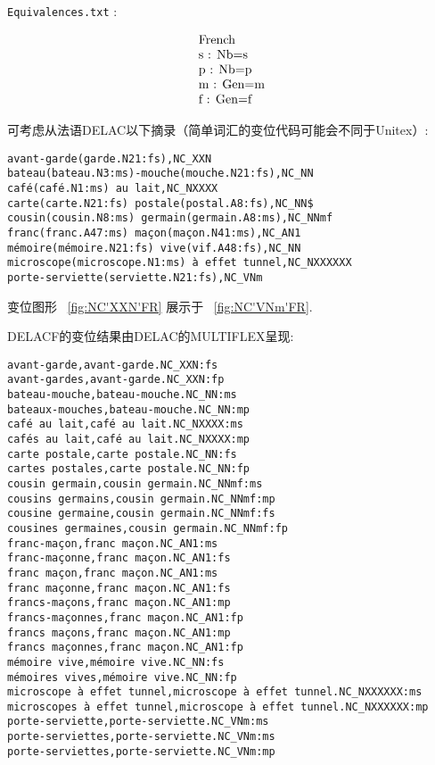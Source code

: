 \bigskip
{} \verb+Equivalences.txt+ :

\[
\begin{array}[l]{l}
$French$ \\
$s : Nb=s$ \\
$p : Nb=p$ \\
$m : Gen=m$ \\
$f : Gen=f$
\end{array}
\]

\bigskip
\noindent 可考虑从法语DELAC以下摘录（简单词汇的变位代码可能会不同于Unitex）:

\begin{verbatim}
avant-garde(garde.N21:fs),NC_XXN
bateau(bateau.N3:ms)-mouche(mouche.N21:fs),NC_NN
café(café.N1:ms) au lait,NC_NXXXX
carte(carte.N21:fs) postale(postal.A8:fs),NC_NN$
cousin(cousin.N8:ms) germain(germain.A8:ms),NC_NNmf
franc(franc.A47:ms) maçon(maçon.N41:ms),NC_AN1
mémoire(mémoire.N21:fs) vive(vif.A48:fs),NC_NN
microscope(microscope.N1:ms) à effet tunnel,NC_NXXXXXX
porte-serviette(serviette.N21:fs),NC_VNm
\end{verbatim}


\bigskip
\noindent 变位图形 ~\ref{fig:NC'XXN'FR} 展示于 ~\ref{fig:NC'VNm'FR}. 

\bigskip
\noindent DELACF的变位结果由DELAC的MULTIFLEX呈现:

\begin{verbatim}
avant-garde,avant-garde.NC_XXN:fs
avant-gardes,avant-garde.NC_XXN:fp
bateau-mouche,bateau-mouche.NC_NN:ms
bateaux-mouches,bateau-mouche.NC_NN:mp
café au lait,café au lait.NC_NXXXX:ms
cafés au lait,café au lait.NC_NXXXX:mp
carte postale,carte postale.NC_NN:fs
cartes postales,carte postale.NC_NN:fp
cousin germain,cousin germain.NC_NNmf:ms
cousins germains,cousin germain.NC_NNmf:mp
cousine germaine,cousin germain.NC_NNmf:fs
cousines germaines,cousin germain.NC_NNmf:fp
franc-maçon,franc maçon.NC_AN1:ms
franc-maçonne,franc maçon.NC_AN1:fs
franc maçon,franc maçon.NC_AN1:ms
franc maçonne,franc maçon.NC_AN1:fs
francs-maçons,franc maçon.NC_AN1:mp
francs-maçonnes,franc maçon.NC_AN1:fp
francs maçons,franc maçon.NC_AN1:mp
francs maçonnes,franc maçon.NC_AN1:fp
mémoire vive,mémoire vive.NC_NN:fs
mémoires vives,mémoire vive.NC_NN:fp
microscope à effet tunnel,microscope à effet tunnel.NC_NXXXXXX:ms
microscopes à effet tunnel,microscope à effet tunnel.NC_NXXXXXX:mp
porte-serviette,porte-serviette.NC_VNm:ms
porte-serviettes,porte-serviette.NC_VNm:ms
porte-serviettes,porte-serviette.NC_VNm:mp 
\end{verbatim}

